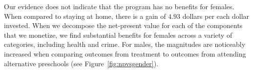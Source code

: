 Our evidence does not indicate that the program has no benefits for females. When compared to staying at home, there is a gain of $4.93$ dollars per each dollar invested. When we decompose the net-present value for each of the components that we monetize, we find substantial benefits for females across a variety of categories, including health and crime. For males, the magnitudes are noticeably increased when comparing outcomes from treatment to outcomes from attending alternative preschools (see Figure~\ref{fig:npvsgender}).